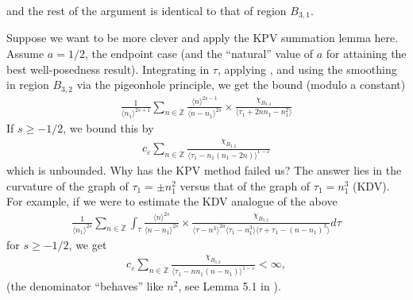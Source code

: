\documentclass[12pt,reqno]{amsart}
\numberwithin{equation}{section}  %
\renewcommand{\cref}{\Cref}
\newcommand{\zz}{\mathbb{Z}}
\newcommand{\zzdot}{\dot{\zz}}
\newcommand{\ee}{\varepsilon}
\begin{document}
and the rest of the argument is identical to that of region $B_{3,1}$.
\begin{framed}
Suppose we want to be more clever and apply the KPV summation lemma here. Assume $a=1/2$, the endpoint case (and the ``natural'' value of $a$ for attaining the best well-posedness result). Integrating in $\tau$, applying \cref{lem:calc}, and using the smoothing in region $B_{3,2}$ via the pigeonhole principle, we get the bound (modulo a constant)
\begin{equation*}
\begin{split}
\frac{1}{\langle n_{1} \rangle^{2s+1}} \sum_{n \in \zzdot} \frac{\langle n \rangle ^{2s-1}}{\langle n - n_{1}\rangle ^{2s}}  \times \frac{\chi_{B_{3,2}}}{\langle \tau_{1} + 2nn_{1} - n_{1}^{2} \rangle} 
\end{split}
\end{equation*}
If $s \ge -1/2$, we bound this by
\begin{equation*}
\begin{split}
c_{\ee}\sum_{n \in \zzdot} \frac{\chi_{B_{3,2}}}{\langle \tau_{1} - n_{1}(  n_{1} - 2n) \rangle^{1-\ee}}
\end{split}
\end{equation*}
which is unbounded. Why has the KPV method failed us? The answer lies in the curvature of the graph of $\tau_{1} = \pm n_{1}^{2}$ versus that of the graph of $\tau_{1} = n_{1}^{3}$ (KDV). For example, if we were to estimate the KDV analogue of the above%
\begin{equation*}
\begin{split}
\frac{1}{\langle n_{1} \rangle^{2s}} \sum_{n \in \zzdot} \int_{\tau} \frac{\langle n \rangle ^{2s}}{\langle n - n_{1}\rangle ^{2s}}  \times \frac{\chi_{B_{3,2}}}{\langle \tau - n^{3} \rangle^{2a} \langle
\tau_{1} - n_{1}^{3} \rangle  \langle \tau + \tau_{1} - (n - n_{1})^{3} \rangle} d \tau
\end{split}
\end{equation*}
for $s \ge -1/2$, we get
\begin{equation*}
\begin{split}
c_{\ee}\sum_{n \in \zzdot} \frac{\chi_{B_{3,2}}}{\langle \tau_{1} - nn_{1}(n - n_{1})\rangle^{1-\ee}} < \infty,
\end{split}
\end{equation*}
(the denominator ``behaves'' like $n^{2}$, see Lemma 5.1 in \cite{Kenig:1996yn}).
\end{framed}
\end{document}
